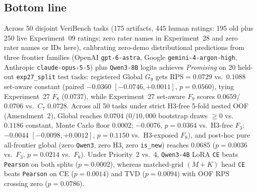 
\subsection*{Bottom line}
Across 50 disjoint VeriBench tasks (175 artifacts, 445 human ratings: 195 old plus 250 live Experiment~09 ratings; zero rater names in Experiment~28 and zero rater names or IDs here), calibrating zero-demo distributional predictions from three frontier families (OpenAI \texttt{gpt-6-astra}, Google \texttt{gemini-4-argon-high}, Anthropic \texttt{claude-opus-5-5}) plus \texttt{Qwen3-8B} logits achieves \emph{Promising} on 20 held-out \texttt{exp27\_split} test tasks: registered Global $G_9$ gets $\mathrm{RPS}=0.0729$ vs.\ $0.1088$ set-aware constant (paired $-0.0360$ $[-0.0746, +0.0011]$, $p=0.0560$), tying Experiment~27 $F_8$ ($0.0737$), while Experiment~27 set-aware $F_9$ scores $0.0659$/$0.0706$ vs.\ $C_7$ $0.0728$. Across all 50 tasks under strict H3-free 5-fold nested OOF (Amendment~2), Global reaches $0.0704$ ($0/10{,}000$ bootstrap draws $\ge 0$ vs.\ $0.1186$ constant, Monte Carlo floor $0.0002$; $-0.0076$, $p=0.0364$ vs.\ H3-free $F_3$; $-0.0044$ $[-0.0098, +0.0012]$, $p=0.1150$ vs.\ H3-exposed $F_8$), and post-hoc pure all-frontier global (zero \texttt{Qwen3}, zero H3, zero \texttt{is\_new}) reaches $0.0685$ ($p=0.0036$ vs.\ $F_3$, $p=0.0214$ vs.\ $F_8$). Under Priority~2 vs.\ 4, \texttt{Qwen3-4B} LoRA \texttt{CE} beats \texttt{Pearson} on both splits ($p=0.0002$), whereas matched-grid $(M+K)$ head \texttt{CE} beats \texttt{Pearson} on CE ($p=0.0014$) and TVD ($p=0.0094$) with OOF RPS crossing zero ($p=0.0786$).

